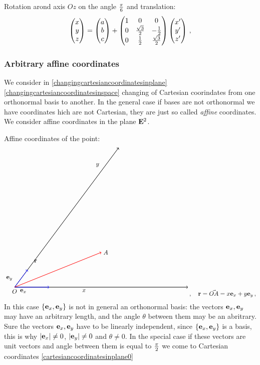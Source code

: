 \documentclass[12pt]{article}
\numberwithin{equation}{section}
\begin{document}
Rotation arond axis $Oz$ on the angle $\pi\over 6$
and translation:
\begin{equation*}
  \begin{pmatrix}
         x \cr
        y\cr
       z\cr
   \end{pmatrix}
         =
  \begin{pmatrix}
         a \cr
        b\cr
       c\cr
   \end{pmatrix}
              +  
      \begin{pmatrix}
    1 &0 & 0\cr
    0 &{\sqrt 3\over 2} &-{1\over 2}\cr
    0 &{1\over 2} &{\sqrt 3\over 2}\cr
         \end{pmatrix}
           \begin{pmatrix}
         x'\cr
        y'\cr
        z'\cr
   \end{pmatrix}\,,
\end{equation*}

\subsubsection{Arbitrary affine coordinates}
 We consider in
\eqref{changingcartesiancoordinatesinplane}
\eqref{changingcartesiancoordinatesinspace}
changing of Cartesian coorindates from one orthonormal
basis to another. In the general case if bases are not orthonormal
we have coordinates hich are not Cartesian, they are just
so called {\it affine} coordinates.
  We consider affine coordinates in the plane ${\bf E}^2$.

   Affine coordinates of the point:
\begin{equation*}
\begin{tikzpicture}
\draw 
[ <-> , thick] 
(10,0)--(0,0)--(6,8);

\draw [thick, ->,blue] (0,0)--(2,0);
\node [below] at (0.5,0) {$\e_x$};

\draw [thick, ->,blue] (0,0)--(0.75,1);
\node [left] at (0,0.5) {$\e_y$};

\node [left] at (5,7) {$y$};
\node [below] at (4,0) {$x$};
\node [below] at (0,0) {$O$};

\draw [thick, red,->] (0,0)--(5,2); 
\node [right] at (1,1.5) {$\r$};
\node [right] at (5,2) {$A$};
\end{tikzpicture}\,,\quad
\r=\vec {OA}=x\e_x+y\e_y\,,
\end{equation*}
In this case 
$\{{\bf e}_x,{\bf e}_y\}$ is not in general an orthonormal basis:
the vectors ${\bf e}_x,{\bf e}_y$ may have an 
arbitrary length, and the angle $\theta$ 
between them may be an abritrary. 
Sure the vectors ${\bf e}_x,{\bf e}_y$ 
have to be linearly independent, since
$\{{\bf e}_x,{\bf e}_y\}$ is a basis, this is why
  $|{\bf e}_x|\not=0$, 
$|{\bf e}_y|\not=0$ and $\theta\not=0$. 
In the special case if 
these vectors are unit vectors and angle between them
is equal to $\pi\over 2$ we come to Cartesian coordinates
\eqref{cartesiancoordinatesinplane0}
\end{document}
